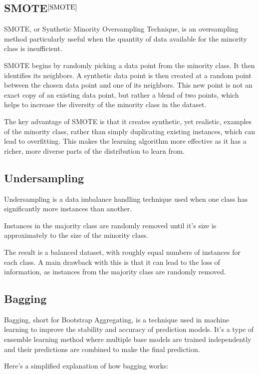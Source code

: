 \documentclass[letterpaper, 11 pt, conference]{ieeeconf}  %
\begin{document}
\subsection{SMOTE$^{\cite{SMOTE}}$}
SMOTE, or Synthetic Minority Oversampling Technique, is an oversampling method particularly useful when the quantity of data available for the minority class is insufficient.

SMOTE begins by randomly picking a data point from the minority class. It then identifies its neighbors. %
A synthetic data point is then created at a random point between the chosen data point and one of its neighbors. This new point is not an exact copy of an existing data point, but rather a blend of two points, which helps to increase the diversity of the minority class in the dataset.

 The key advantage of SMOTE is that it creates synthetic, yet realistic, examples of the minority class, rather than simply duplicating existing instances, which can lead to overfitting. This makes the learning algorithm more effective as it has a richer, more diverse parts of the distribution to learn from.
\subsection{Undersampling}
Undersampling is a data imbalance handling technique used when one class has significantly more instances than another.

Instances in the majority class are randomly removed until it's size is approximately to the size of the minority class.

The result is a balanced dataset, with roughly equal numbers of instances for each class. A main drawback with this is that it can lead to the loss of information, as instances from the majority class are randomly removed.

\subsection{Bagging}%
Bagging, short for Bootstrap Aggregating, is a technique used in machine learning to improve the stability and accuracy of prediction models. It's a type of ensemble learning method where multiple base models are trained independently and their predictions are combined to make the final prediction.

Here's a simplified explanation of how bagging works:
\end{document}

